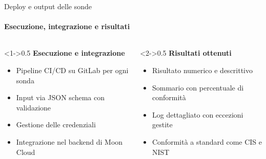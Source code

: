 \documentclass{beamer}
\begin{document}
\begin{frame}{Deploy e output delle sonde}
    \framesubtitle{Esecuzione, integrazione e risultati}
    \begin{columns}
        \begin{column}<1->{0.5\textwidth}
            \textbf{Esecuzione e integrazione}
            \begin{itemize}
                \item Pipeline CI/CD su GitLab per ogni sonda
                \item Input via JSON schema con validazione
                \item Gestione delle credenziali
                \item Integrazione nel backend di Moon Cloud
            \end{itemize}
        \end{column}
        \begin{column}<2->{0.5\textwidth}
            \textbf{Risultati ottenuti}
            \begin{itemize}
                \item Risultato numerico e descrittivo
                \item Sommario con percentuale di conformità
                \item Log dettagliato con eccezioni gestite
                \item Conformità a standard come CIS e NIST
            \end{itemize}
        \end{column}
    \end{columns}
\end{frame}
\end{document}
